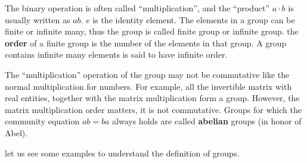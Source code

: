 \documentclass[b5paper]{article}
\begin{document}
The binary operation is often called ``multiplication'', and the ``product'' $a \cdot b$ is usually written as $ab$. $e$ is the identity element. The elements in a group can be finite or infinite many, thus the group is called finite group or infinite group. the \textbf{order} of a finite group is the number of the elements in that group. A group contains infinite many elements is said to have infinite order.

The ``multiplication'' operation of the group may not be commutative like the normal multiplication for numbers. For example, all the invertible matrix with real entities, together with the matrix multiplication form a group. However, the matrix multiplication order matters, it is not commutative. Groups for which the community equation $ab = ba$ always holds are called \textbf{abelian} groups (in honor of Abel).

let us see some examples to understand the definition of groups.
\end{document}
